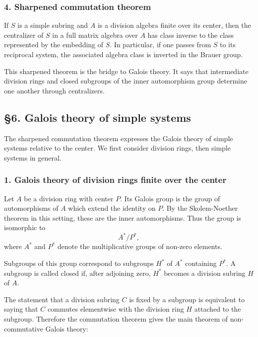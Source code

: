 \documentclass[
  11pt,
]{article}
\begin{document}
\subsubsection{4. Sharpened commutation
theorem}\label{sharpened-commutation-theorem}

If \(S\) is a simple subring and \(A\) is a division algebra finite over
its center, then the centralizer of \(S\) in a full matrix algebra over
\(A\) has class inverse to the class represented by the embedding of
\(S\). In particular, if one passes from \(S\) to its reciprocal system,
the associated algebra class is inverted in the Brauer group.

This sharpened theorem is the bridge to Galois theory. It says that
intermediate division rings and closed subgroups of the inner
automorphism group determine one another through centralizers.

\subsection{§6. Galois theory of simple
systems}\label{galois-theory-of-simple-systems}

The sharpened commutation theorem expresses the Galois theory of simple
systems relative to the center. We first consider division rings, then
simple systems in general.

\subsubsection{1. Galois theory of division rings finite over the
center}\label{galois-theory-of-division-rings-finite-over-the-center}

Let \(A\) be a division ring with center \(P\). Its Galois group is the
group of automorphisms of \(A\) which extend the identity on \(P\). By
the Skolem-Noether theorem in this setting, these are the inner
automorphisms. Thus the group is isomorphic to \[
  A^*/P^*,
\] where \(A^*\) and \(P^*\) denote the multiplicative groups of
non-zero elements.

Subgroups of this group correspond to subgroups \(H^*\) of \(A^*\)
containing \(P^*\). A subgroup is called closed if, after adjoining
zero, \(H^*\) becomes a division subring \(H\) of \(A\).

The statement that a division subring \(C\) is fixed by a subgroup is
equivalent to saying that \(C\) commutes elementwise with the division
ring \(H\) attached to the subgroup. Therefore the commutation theorem
gives the main theorem of non-commutative Galois theory:
\end{document}

